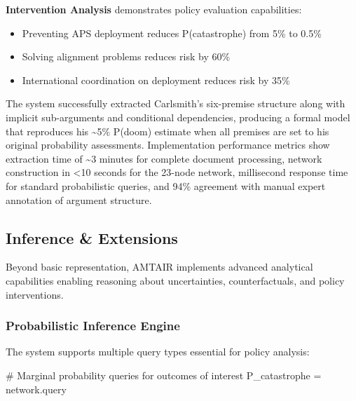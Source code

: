 \documentclass[
  11pt,
  letterpaper,
]{book}
\newenvironment{Shaded}{\begin{snugshade}}{\end{snugshade}}
\newcommand{\CommentTok}[1]{\textcolor[rgb]{0.37,0.37,0.37}{#1}}
\newcommand{\NormalTok}[1]{\textcolor[rgb]{0.00,0.23,0.31}{#1}}
\newcommand{\OperatorTok}[1]{\textcolor[rgb]{0.37,0.37,0.37}{#1}}
\providecommand{\tightlist}{%
  \setlength{\itemsep}{0pt}\setlength{\parskip}{0pt}}
\begin{document}
\textbf{Intervention Analysis} demonstrates policy evaluation
capabilities:

\begin{itemize}
\tightlist
\item
  Preventing APS deployment reduces P(catastrophe) from 5\% to 0.5\%
\item
  Solving alignment problems reduces risk by 60\%
\item
  International coordination on deployment reduces risk by 35\%
\end{itemize}

The system successfully extracted Carlsmith's six-premise structure
along with implicit sub-arguments and conditional dependencies,
producing a formal model that reproduces his \textasciitilde5\% P(doom)
estimate when all premises are set to his original probability
assessments. Implementation performance metrics show extraction time of
\textasciitilde3 minutes for complete document processing, network
construction in \textless10 seconds for the 23-node network, millisecond
response time for standard probabilistic queries, and 94\% agreement
with manual expert annotation of argument structure.

\subsection{Inference \& Extensions}\label{sec-inference-extensions}

Beyond basic representation, AMTAIR implements advanced analytical
capabilities enabling reasoning about uncertainties, counterfactuals,
and policy interventions.

\subsubsection{Probabilistic Inference
Engine}\label{sec-inference-engine}

The system supports multiple query types essential for policy analysis:

\begin{Shaded}
\begin{Highlighting}[]
\CommentTok{\# Marginal probability queries for outcomes of interest}
\NormalTok{P\_catastrophe }\OperatorTok{=}\NormalTok{ network.query}
\end{Highlighting}
\end{Shaded}



\backmatter
\printbibliography[title=Bibliography]
\end{document}
